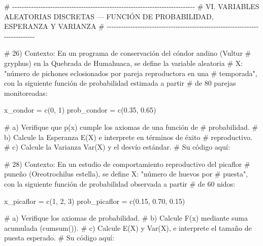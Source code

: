 \documentclass[
  spanish,
  letterpaper,
  DIV=11,
  numbers=noendperiod]{scrreprt}
\newenvironment{Shaded}{\begin{snugshade}}{\end{snugshade}}
\newcommand{\CommentTok}[1]{\textcolor[rgb]{0.37,0.37,0.37}{#1}}
\newcommand{\DecValTok}[1]{\textcolor[rgb]{0.68,0.00,0.00}{#1}}
\newcommand{\FloatTok}[1]{\textcolor[rgb]{0.68,0.00,0.00}{#1}}
\newcommand{\FunctionTok}[1]{\textcolor[rgb]{0.28,0.35,0.67}{#1}}
\newcommand{\NormalTok}[1]{\textcolor[rgb]{0.00,0.23,0.31}{#1}}
\newcommand{\OtherTok}[1]{\textcolor[rgb]{0.00,0.23,0.31}{#1}}
\begin{document}
\begin{Shaded}
\begin{Highlighting}[]
\CommentTok{\# {-}{-}{-}{-}{-}{-}{-}{-}{-}{-}{-}{-}{-}{-}{-}{-}{-}{-}{-}{-}{-}{-}{-}{-}{-}{-}{-}{-}{-}{-}{-}{-}{-}{-}{-}{-}{-}{-}{-}{-}{-}{-}{-}{-}{-}{-}{-}{-}{-}{-}{-}{-}{-}{-}{-}{-}{-}{-}{-}{-}{-}{-}{-}{-}{-}{-}{-}{-}{-}{-}{-}{-}{-}{-}{-}{-}{-}}
\CommentTok{\# VI. VARIABLES ALEATORIAS DISCRETAS — FUNCIÓN DE PROBABILIDAD, ESPERANZA Y VARIANZA}
\CommentTok{\# {-}{-}{-}{-}{-}{-}{-}{-}{-}{-}{-}{-}{-}{-}{-}{-}{-}{-}{-}{-}{-}{-}{-}{-}{-}{-}{-}{-}{-}{-}{-}{-}{-}{-}{-}{-}{-}{-}{-}{-}{-}{-}{-}{-}{-}{-}{-}{-}{-}{-}{-}{-}{-}{-}{-}{-}{-}{-}{-}{-}{-}{-}{-}{-}{-}{-}{-}{-}{-}{-}{-}{-}{-}{-}{-}{-}{-}}

\CommentTok{\# 26) Contexto: En un programa de conservación del cóndor andino (Vultur}
\CommentTok{\#     gryphus) en la Quebrada de Humahuaca, se define la variable aleatoria}
\CommentTok{\#     X: "número de pichones eclosionados por pareja reproductora en una}
\CommentTok{\#     temporada", con la siguiente función de probabilidad estimada a partir}
\CommentTok{\#     de 80 parejas monitoreadas:}

\NormalTok{x\_condor }\OtherTok{=} \FunctionTok{c}\NormalTok{(}\DecValTok{0}\NormalTok{, }\DecValTok{1}\NormalTok{)}
\NormalTok{prob\_condor }\OtherTok{=} \FunctionTok{c}\NormalTok{(}\FloatTok{0.35}\NormalTok{, }\FloatTok{0.65}\NormalTok{)}

\CommentTok{\#     a) Verifique que p(x) cumple los axiomas de una función de}
\CommentTok{\#        probabilidad.}
\CommentTok{\#     b) Calcule la Esperanza E(X) e interprete en términos de éxito}
\CommentTok{\#        reproductivo.}
\CommentTok{\#     c) Calcule la Varianza Var(X) y el desvío estándar.}
\CommentTok{\# Su código aquí:}


\CommentTok{\# 28) Contexto: En un estudio de comportamiento reproductivo del picaflor}
\CommentTok{\#     puneño (Oreotrochilus estella), se define X: "número de huevos por}
\CommentTok{\#     puesta", con la siguiente función de probabilidad observada a partir}
\CommentTok{\#     de 60 nidos:}

\NormalTok{x\_picaflor }\OtherTok{=} \FunctionTok{c}\NormalTok{(}\DecValTok{1}\NormalTok{, }\DecValTok{2}\NormalTok{, }\DecValTok{3}\NormalTok{)}
\NormalTok{prob\_picaflor }\OtherTok{=} \FunctionTok{c}\NormalTok{(}\FloatTok{0.15}\NormalTok{, }\FloatTok{0.70}\NormalTok{, }\FloatTok{0.15}\NormalTok{)}

\CommentTok{\#     a) Verifique los axiomas de probabilidad.}
\CommentTok{\#     b) Calcule F(x) mediante suma acumulada (cumsum()).}
\CommentTok{\#     c) Calcule E(X) y Var(X), e interprete el tamaño de puesta esperado.}
\CommentTok{\# Su código aquí:}



\end{Highlighting}
\end{Shaded}
\end{document}
